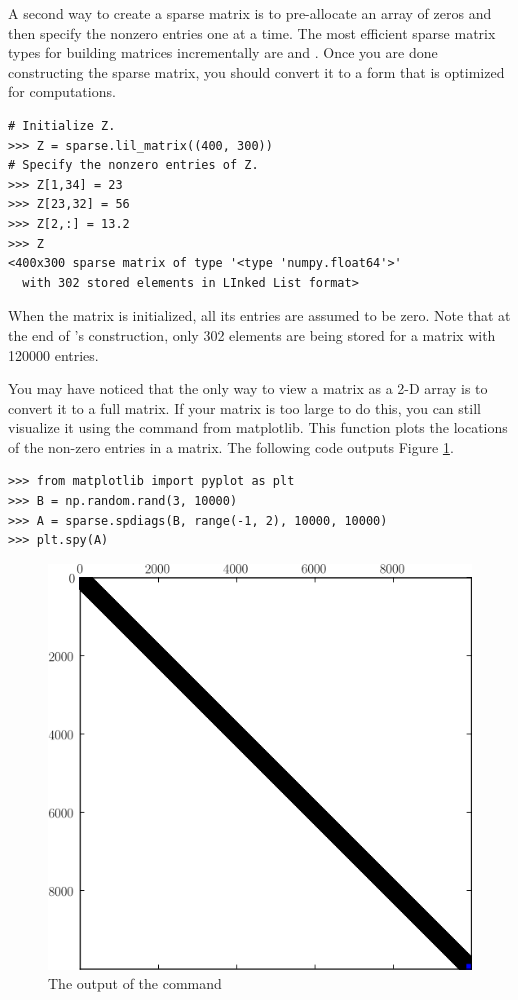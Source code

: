 A second way to create a sparse matrix is to pre-allocate an array of zeros and then specify the nonzero entries one at a time.
The most efficient sparse matrix types for building matrices incrementally are  and .
Once you are done constructing the sparse matrix, you should convert it to a form that is optimized for computations.

\begin{lstlisting}
# Initialize Z.
>>> Z = sparse.lil_matrix((400, 300))
# Specify the nonzero entries of Z.
>>> Z[1,34] = 23
>>> Z[23,32] = 56
>>> Z[2,:] = 13.2
>>> Z
<400x300 sparse matrix of type '<type 'numpy.float64'>'
  with 302 stored elements in LInked List format>

\end{lstlisting}

When the matrix  is initialized, all its entries are assumed to be zero.
Note that at the end of 's construction, only 302 elements are being stored for a matrix with 120000 entries.

You may have noticed that the only way to view a matrix as a 2-D array is to convert it to a full matrix.
If your matrix is too large to do this, you can still visualize it using the  command from matplotlib.
This function plots the locations of the non-zero entries in a matrix.
The following code outputs Figure \ref{fig:mpl_spy}.

\begin{lstlisting}
>>> from matplotlib import pyplot as plt
>>> B = np.random.rand(3, 10000)
>>> A = sparse.spdiags(B, range(-1, 2), 10000, 10000)
>>> plt.spy(A)
\end{lstlisting}

\begin{figure}
\centering
\includegraphics[width=.75\textwidth]{spy.png}
\caption{The output of the  command}
\label{fig:mpl_spy}
\end{figure}

